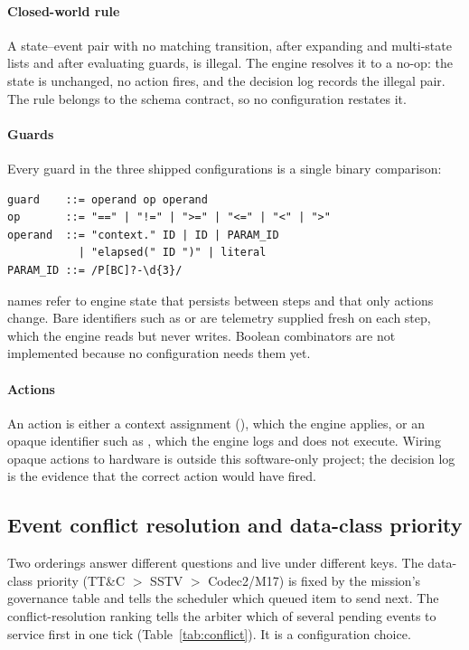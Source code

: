 \documentclass[preprint,12pt]{elsarticle}
\newcommand{\ttc}{TT\&C}
\begin{document}
\paragraph{Closed-world rule} A state--event pair with no matching transition, after expanding  and multi-state  lists and after evaluating guards, is illegal. The engine resolves it to a no-op: the state is unchanged, no action fires, and the decision log records the illegal pair. The rule belongs to the schema contract, so no configuration restates it.

\paragraph{Guards} Every guard in the three shipped configurations is a single binary comparison:
\begin{verbatim}
guard    ::= operand op operand
op       ::= "==" | "!=" | ">=" | "<=" | "<" | ">"
operand  ::= "context." ID | ID | PARAM_ID
           | "elapsed(" ID ")" | literal
PARAM_ID ::= /P[BC]?-\d{3}/
\end{verbatim}
 names refer to engine state that persists between steps and that only actions change. Bare identifiers such as  or  are telemetry supplied fresh on each step, which the engine reads but never writes. Boolean combinators are not implemented because no configuration needs them yet.

\paragraph{Actions} An action is either a context assignment (), which the engine applies, or an opaque identifier such as , which the engine logs and does not execute. Wiring opaque actions to hardware is outside this software-only project; the decision log is the evidence that the correct action would have fired.

\subsection{Event conflict resolution and data-class priority}

Two orderings answer different questions and live under different keys. The data-class priority (\ttc{} $>$ SSTV $>$ Codec2/M17) is fixed by the mission's governance table and tells the scheduler which queued item to send next. The conflict-resolution ranking tells the arbiter which of several pending events to service first in one tick (Table~\ref{tab:conflict}). It is a configuration choice.
\end{document}
